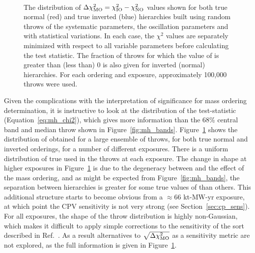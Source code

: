 \begin{figure*}[htbp]
  \centering
  \\
  \caption{The distribution of $\Delta\chi^{2}_{\mathrm{MO}} = \chi^{2}_{\mathrm{IO}} - \chi^{2}_{\mathrm{NO}}$ values shown for both true normal (red) and true inverted (blue) hierarchies built using random throws of the systematic parameters, the oscillation parameters and with statistical variations. In each case, the $\chi^{2}$ values are separately minimized with respect to all variable parameters before calculating the test statistic. The fraction of throws for which the value of \dchisqMO is greater than (less than) 0 is also given for inverted (normal) hierarchies. For each ordering and exposure, approximately 100,000 throws were used.}
  \label{fig:mh_comp_over_time}
\end{figure*}
Given the complications with the interpretation of significance for mass ordering determination, it is instructive to look at the distribution of the test-statistic (Equation~\ref{eq:mh_chi2}), which gives more information than the 68\% central band and median throw shown in Figure~\ref{fig:mh_bands}. Figure~\ref{fig:mh_comp_over_time} shows the distribution of \dchisqMO obtained for a large ensemble of throws, for both true normal and inverted orderings, for a number of different exposures. There is a uniform distribution of true \deltacp used in the throws at each exposure. The change in shape at higher exposures in Figure~\ref{fig:mh_comp_over_time} is due to the degeneracy between \deltacp and the effect of the mass ordering, and as might be expected from Figure~\ref{fig:mh_bands}, the separation between hierarchies is greater for some true values of \deltacp than others. This additional structure starts to become obvious from a $\approx$66 kt-MW-yr exposure, at which point the CPV sensitivity is not very strong (see Section~\ref{sec:cp_sens}). For all exposures, the shape of the throw distribution is highly non-Gaussian, which makes it difficult to apply simple corrections to the sensitivity of the sort described in Ref.~\cite{Blennow:2013oma}. As a result alternatives to $\sqrt{\Delta\chi^{2}_{\mathrm{MO}}}$ as a sensitivity metric are not explored, as the full information is given in Figure~\ref{fig:mh_comp_over_time}.


